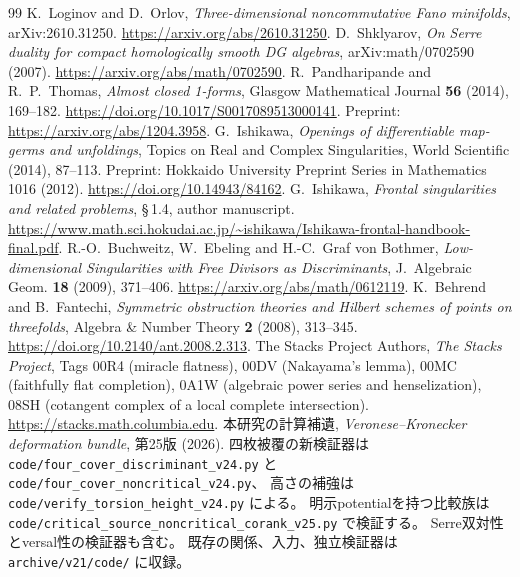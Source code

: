 \begin{thebibliography}{99}
K.~Loginov and D.~Orlov,
\emph{Three-dimensional noncommutative Fano minifolds}, arXiv:2610.31250.
\url{https://arxiv.org/abs/2610.31250}.
D.~Shklyarov,
\emph{On Serre duality for compact homologically smooth DG algebras},
arXiv:math/0702590 (2007).
\url{https://arxiv.org/abs/math/0702590}.
R.~Pandharipande and R.~P.~Thomas,
\emph{Almost closed 1-forms},
Glasgow Mathematical Journal \textbf{56} (2014), 169--182.
\url{https://doi.org/10.1017/S0017089513000141}.
Preprint: \url{https://arxiv.org/abs/1204.3958}.
G.~Ishikawa,
\emph{Openings of differentiable map-germs and unfoldings},
Topics on Real and Complex Singularities, World Scientific (2014), 87--113.
Preprint: Hokkaido University Preprint Series in Mathematics 1016 (2012).
\url{https://doi.org/10.14943/84162}.
G.~Ishikawa, \emph{Frontal singularities and related problems},
\S\,1.4, author manuscript.
\url{https://www.math.sci.hokudai.ac.jp/~ishikawa/Ishikawa-frontal-handbook-final.pdf}.
R.-O.~Buchweitz, W.~Ebeling and H.-C.~Graf von Bothmer,
\emph{Low-dimensional Singularities with Free Divisors as Discriminants},
J.~Algebraic Geom. \textbf{18} (2009), 371--406.
\url{https://arxiv.org/abs/math/0612119}.
K.~Behrend and B.~Fantechi,
\emph{Symmetric obstruction theories and Hilbert schemes of points on threefolds},
Algebra \& Number Theory \textbf{2} (2008), 313--345.
\url{https://doi.org/10.2140/ant.2008.2.313}.
The Stacks Project Authors, \emph{The Stacks Project},
Tags 00R4 (miracle flatness), 00DV (Nakayama's lemma),
00MC (faithfully flat completion), 0A1W (algebraic power series and henselization),
08SH (cotangent complex of a local complete intersection).
\url{https://stacks.math.columbia.edu}.
本研究の計算補遺, \emph{Veronese--Kronecker deformation bundle}, 第25版 (2026).
四枚被覆の新検証器は \nolinkurl{code/four_cover_discriminant_v24.py} と
\nolinkurl{code/four_cover_noncritical_v24.py}、
高さの補強は \nolinkurl{code/verify_torsion_height_v24.py} による。
明示potentialを持つ比較族は \nolinkurl{code/critical_source_noncritical_corank_v25.py} で検証する。
Serre双対性とversal性の検証器も含む。
既存の関係、入力、独立検証器は \nolinkurl{archive/v21/code/} に収録。
\end{thebibliography}

